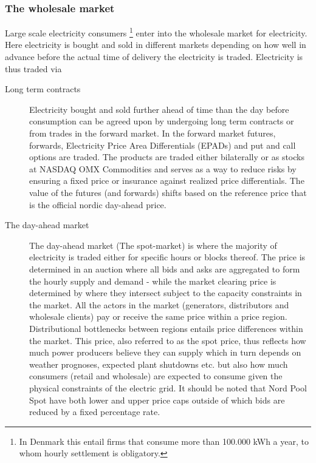 \subsubsection{The wholesale market}
\label{subsubsec: t_whomarket}
Large scale electricity consumers \footnote{In Denmark this entail firms that consume more than 100.000 kWh  a year, to whom hourly settlement is obligatory.} enter into the wholesale market for electricity. Here electricity is bought and sold in different markets depending on how well in advance before the actual time of delivery the electricity is traded. Electricity is thus traded via

\begin{description}

    \item [Long term contracts]
    Electricity bought and sold further ahead of time than the day before consumption can be agreed upon by undergoing long term contracts or from trades in the forward market. In the forward market futures, forwards, Electricity Price Area Differentials (EPADs) and put and call options are traded. The products are traded either bilaterally or as stocks at NASDAQ OMX Commodities and serves as a way to reduce risks by ensuring a fixed price or insurance against realized price differentials. The value of the futures (and forwards) shifts based on the reference price that is the official nordic day-ahead price.

    \item[The day-ahead market]
    The day-ahead market (The spot-market) is where the majority of electricity is traded either for specific hours or blocks thereof. The price is determined in an auction where all bids and asks are aggregated to form the hourly supply and demand - while the market clearing price is determined by where they intersect subject to the capacity constraints in the market. All the actors in the market (generators, distributors and wholesale clients) pay or receive the same price within a price region. Distributional bottlenecks between regions entails price differences within the market. This price, also referred to as the spot price, thus reflects how much power producers believe they can supply which in turn depends on weather prognoses, expected plant shutdowns etc. but also how much consumers (retail and wholesale) are expected to consume given the physical constraints of the electric grid. It should be noted that Nord Pool Spot have both lower and upper price caps outside of which bids are reduced by a fixed percentage rate.


\end{description}
